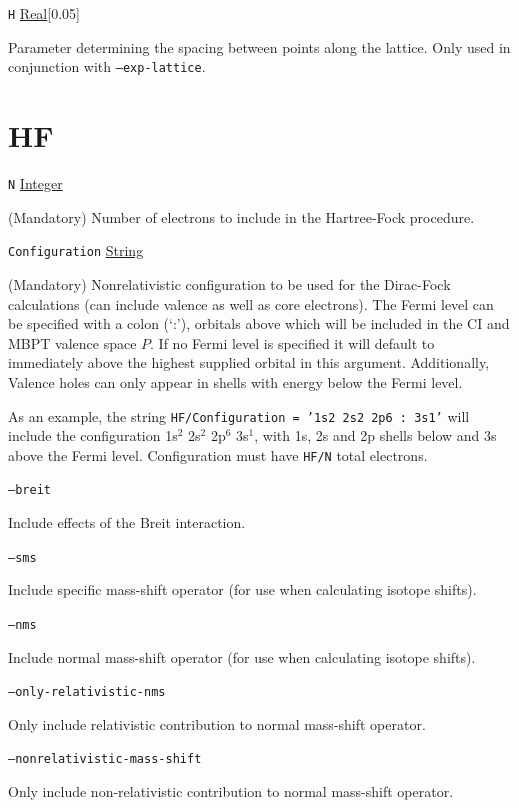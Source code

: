 \documentclass{report}
\begin{document}
\texttt{H} \uline{Real}[0.05]
\begin{adjustwidth}{1cm}{}
Parameter determining the spacing between points along the lattice. Only used in conjunction with
\texttt{--exp-lattice}.
\end{adjustwidth}

\section{HF}

\texttt{N} \uline{Integer}
\begin{adjustwidth}{1cm}{}
(Mandatory) Number of electrons to include in the Hartree-Fock procedure.
\end{adjustwidth}
\texttt{Configuration} \uline{String} 
\begin{adjustwidth}{1cm}{}
(Mandatory) Nonrelativistic configuration to be used for the
Dirac-Fock calculations (can include valence as well as core electrons). The Fermi level can be specified
with a colon (`:'), orbitals above which will be included in the CI and MBPT valence space $P$. If no
Fermi level is specified it will default to immediately above the highest supplied orbital in this
argument. Additionally, Valence holes can only appear in shells with energy below the Fermi level.
                                                                               
As an example, the string \texttt{HF/Configuration = '1s2 2s2 2p6 : 3s1'} will include the configuration
1s$^2$ 2s$^2$ 2p$^6$ 3s$^1$, with 1s, 2s and 2p shells below and 3s above the Fermi level.
Configuration must have \texttt{HF/N} total electrons.
\end{adjustwidth}

\texttt{--breit} 
\begin{adjustwidth}{1cm}{}
Include effects of the Breit interaction.
\end{adjustwidth}
\texttt{--sms} 
\begin{adjustwidth}{1cm}{}
Include specific mass-shift operator (for use when calculating isotope shifts).
\end{adjustwidth}
\texttt{--nms} 
\begin{adjustwidth}{1cm}{}
Include normal mass-shift operator (for use when calculating isotope shifts).
\end{adjustwidth}
\texttt{--only-relativistic-nms} 
\begin{adjustwidth}{1cm}{}
Only include relativistic contribution to normal mass-shift operator.
\end{adjustwidth}
\texttt{--nonrelativistic-mass-shift} 
\begin{adjustwidth}{1cm}{}
Only include non-relativistic contribution to normal mass-shift operator.
\end{adjustwidth}
\end{document}
